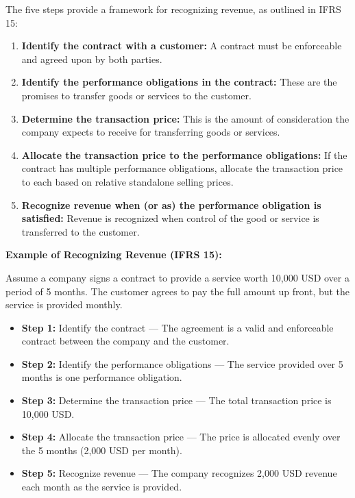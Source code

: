 \documentclass[12pt,a4paper]{book}
\begin{document}
The five steps provide a framework for recognizing revenue, as outlined in IFRS 15:

\begin{enumerate}
    \item \textbf{Identify the contract with a customer:} A contract must be enforceable and agreed upon by both parties.
    \item \textbf{Identify the performance obligations in the contract:} These are the promises to transfer goods or services to the customer.
    \item \textbf{Determine the transaction price:} This is the amount of consideration the company expects to receive for transferring goods or services.
    \item \textbf{Allocate the transaction price to the performance obligations:} If the contract has multiple performance obligations, allocate the transaction price to each based on relative standalone selling prices.
    \item \textbf{Recognize revenue when (or as) the performance obligation is satisfied:} Revenue is recognized when control of the good or service is transferred to the customer.
\end{enumerate}

\vspace{0.5cm}
\textbf{Example of Recognizing Revenue (IFRS 15):}

Assume a company signs a contract to provide a service worth 10,000 USD over a period of 5 months. The customer agrees to pay the full amount up front, but the service is provided monthly.

\begin{itemize}
    \item \textbf{Step 1:} Identify the contract — The agreement is a valid and enforceable contract between the company and the customer.
    \item \textbf{Step 2:} Identify the performance obligations — The service provided over 5 months is one performance obligation.
    \item \textbf{Step 3:} Determine the transaction price — The total transaction price is 10,000 USD.
    \item \textbf{Step 4:} Allocate the transaction price — The price is allocated evenly over the 5 months (2,000 USD per month).
    \item \textbf{Step 5:} Recognize revenue — The company recognizes 2,000 USD revenue each month as the service is provided.
\end{itemize}
\end{document}
